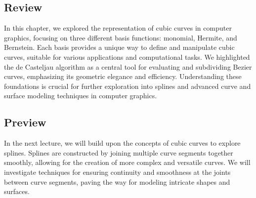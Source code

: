 \documentclass{article}
\begin{document}
\subsection{Review}

In this chapter, we explored the representation of cubic curves in computer graphics, focusing on three different basis functions: monomial, Hermite, and Bernstein. Each basis provides a unique way to define and manipulate cubic curves, suitable for various applications and computational tasks. We highlighted the de Casteljau algorithm as a central tool for evaluating and subdividing Bezier curves, emphasizing its geometric elegance and efficiency. Understanding these foundations is crucial for further exploration into splines and advanced curve and surface modeling techniques in computer graphics.

\subsection{Preview}

In the next lecture, we will build upon the concepts of cubic curves to explore splines. Splines are constructed by joining multiple curve segments together smoothly, allowing for the creation of more complex and versatile curves. We will investigate techniques for ensuring continuity and smoothness at the joints between curve segments, paving the way for modeling intricate shapes and surfaces.
\end{document}
